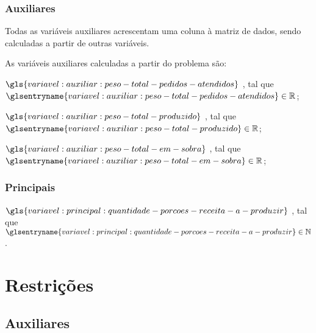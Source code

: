 \subsubsection{Auxiliares}

Todas as variáveis auxiliares acrescentam uma coluna à matriz de dados, sendo calculadas a partir de outras variáveis.

As variáveis auxiliares calculadas a partir do problema são:

\begin{symbols}
    \item[\( \gls{variavel:auxiliar:peso-total-pedidos-atendidos} \)]
    ,
    tal que \( \glsentryname{variavel:auxiliar:peso-total-pedidos-atendidos} \in \mathbb{R} \);

    \item[\( \gls{variavel:auxiliar:peso-total-produzido} \)]
    ,
    tal que \( \glsentryname{variavel:auxiliar:peso-total-produzido} \in \mathbb{R} \);

    \item[\( \gls{variavel:auxiliar:peso-total-em-sobra} \)]
    ,
    tal que \( \glsentryname{variavel:auxiliar:peso-total-em-sobra} \in \mathbb{R} \);
\end{symbols}

\subsubsection{Principais}

\begin{symbols}
    \item[\( \gls{variavel:principal:quantidade-porcoes-receita-a-produzir} \)]
    ,
    tal que \( \glsentryname{variavel:principal:quantidade-porcoes-receita-a-produzir} \in \mathbb{N} \).
\end{symbols}

\section{Restrições}

\subsection{Auxiliares}

